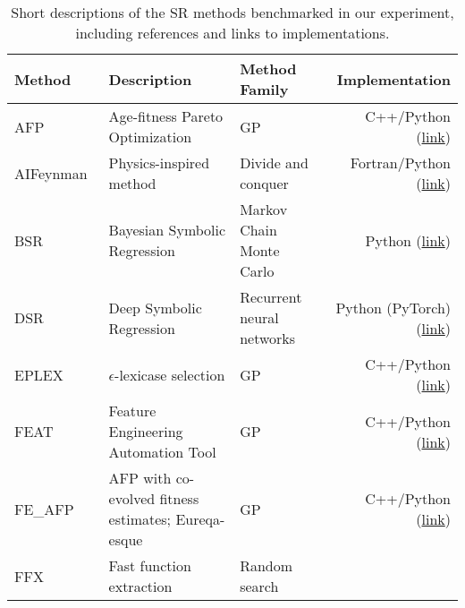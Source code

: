 \begin{table}
    \footnotesize
    \center
    \caption{
        Short descriptions of the SR methods benchmarked in our experiment, including references and links to implementations. 
    }\label{tbl:methods}
    \begin{tabular}{l L{12em} L{8em} r}
        Method      &   Description                                         &   Method Family                       &   Implementation  \\ 
        \midrule
        AFP~\cite{schmidtAgefitnessParetoOptimization2011}               &   Age-fitness Pareto Optimization     &   GP
                    &   C++/Python (\href{https://github.com/EpistasisLab/ellyn}{link})                  \\
        AIFeynman~\cite{udrescuAIFeynmanParetooptimal2020}               &   Physics-inspired method             &   Divide and conquer
                    &   Fortran/Python (\href{https://github.com/SJ001/AI-Feynman}{link})              \\
        BSR~\cite{jinBayesianSymbolicRegression2020}                     &   Bayesian Symbolic Regression        &   Markov Chain Monte Carlo
                    &   Python (\href{https://github.com/ying531/MCMC-SymReg}{link})                      \\
        DSR~\cite{petersenDeepSymbolicRegression2020}                    &   Deep Symbolic Regression            &   Recurrent neural networks   
                    &   Python (PyTorch) (\href{https://github.com/brendenpetersen/deep-symbolic-regression}{link})            \\
        EPLEX~\cite{lacavaProbabilisticMultiobjectiveAnalysis2019}       &   $\epsilon$-lexicase selection       &   GP
                    &   C++/Python (\href{https://github.com/EpistasisLab/ellyn}{link})                  \\
        FEAT~\cite{lacavaLearningConciseRepresentations2019c}        &   Feature Engineering Automation Tool &   GP                          
                    &   C++/Python (\href{https://github.com/lacava/feat}{link})                  \\
        FE\_AFP~\cite{schmidtDistillingFreeformNatural2009b}               &   AFP with co-evolved fitness estimates; Eureqa-esque     &   GP
                    &   C++/Python (\href{https://github.com/EpistasisLab/ellyn}{link})                  \\
        FFX~\cite{mcconaghyFFXFastScalable2011}         &   Fast function extraction             &   Random search               

\end{tabular}
\end{table}
